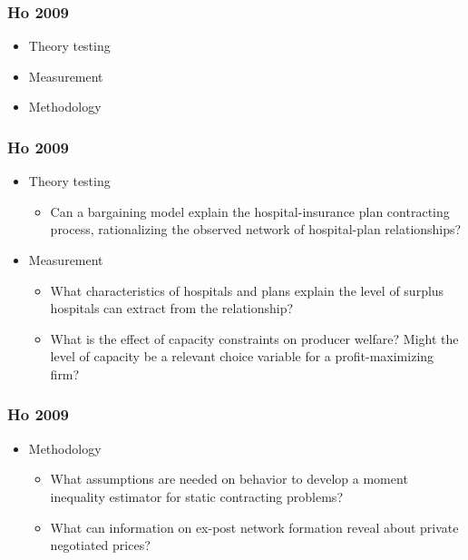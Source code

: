 \begin{frame}
\frametitle{Ho 2009}

\begin{itemize}
	\item Theory testing
	\item Measurement
	\item Methodology
\end{itemize}
\end{frame}


\begin{frame}
\frametitle{Ho 2009}

\begin{itemize}
	\item Theory testing
         \begin{itemize}
	\item Can a bargaining model explain the hospital-insurance plan contracting process, rationalizing the observed network of hospital-plan relationships? 	\end{itemize}
	\item Measurement
	\begin{itemize}
	\item What characteristics of hospitals and plans explain the level of surplus hospitals can extract from the relationship?
	\item What is the effect of capacity constraints on producer welfare?  Might the level of capacity be a relevant choice variable for a profit-maximizing firm?
	\end{itemize}
\end{itemize}
\end{frame}


\begin{frame}
\frametitle{Ho 2009}

\begin{itemize}
	\item Methodology
	\begin{itemize}
	\item What assumptions are needed on behavior to develop a moment inequality estimator for static contracting problems?
	\item What can information on ex-post network formation reveal about private negotiated prices?
	\end{itemize}
\end{itemize}
\end{frame}

